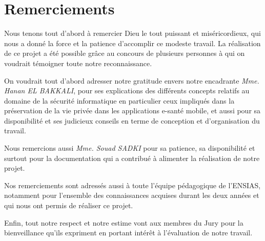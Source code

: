 
\chapter*{Remerciements}

Nous tenons tout d'abord à remercier Dieu le tout puissant et miséricordieux, qui nous a donné la force et la patience d'accomplir ce modeste travail. La réalisation de ce projet a été possible grâce au concours de plusieurs personnes à qui on voudrait témoigner toute notre reconnaissance.

\vspace{6pt}
\paragraphmark

On voudrait tout d'abord adresser notre gratitude envers notre encadrante \textit{Mme. Hanan EL BAKKALI},
pour ses explications des différents concepts relatifs au domaine de la sécurité informatique en particulier ceux impliqués dans la préservation de la vie privée dans les applications e-santé mobile, et aussi pour sa disponibilité et ses judicieux conseils en terme de conception et d'organisation du travail.

\vspace{6pt}
\paragraphmark

Nous remercions aussi \textit{Mme. Souad SADKI} pour sa patience, sa disponibilité et surtout pour la documentation qui a contribué à alimenter la réalisation de notre projet.

\vspace{6pt}
\paragraphmark

Nos remerciements sont adressés aussi à toute l’équipe pédagogique de l’ENSIAS, notamment pour l’ensemble des connaissances acquises durant les deux années et qui nous ont permis de réaliser ce projet.

\vspace{6pt}
\paragraphmark

Enfin, tout notre respect et notre estime vont aux membres du Jury pour la bienveillance qu’ils expriment en portant intérêt à l’évaluation de notre travail.
